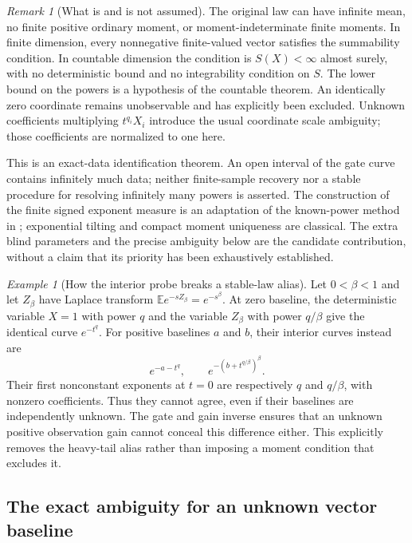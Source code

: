 \documentclass[11pt,letterpaper]{article}
\theoremstyle{definition}
\theoremstyle{remark}
\newtheorem{remark}[theorem]{Remark}
\newtheorem{example}[theorem]{Example}
\newcommand{\1}{\mathbf 1}
\begin{document}
\begin{remark}[What is and is not assumed]
The original law can have infinite mean, no finite positive ordinary
moment, or moment-indeterminate finite moments. In finite dimension,
every nonnegative finite-valued vector satisfies the summability
condition. In countable dimension the condition is $S(X)<\infty$
almost surely, with no deterministic bound and no integrability
condition on $S$. The lower bound on the powers is a hypothesis of
the countable theorem. An identically zero coordinate remains
unobservable and has explicitly been excluded. Unknown coefficients
multiplying $t^{q_i}X_i$ introduce the usual coordinate scale ambiguity;
those coefficients are normalized to one here.

This is an exact-data identification theorem. An open interval of the
gate curve contains infinitely much data; neither finite-sample
recovery nor a stable procedure for resolving infinitely many powers
is asserted. The construction of the finite signed exponent measure
is an adaptation of the known-power method in
\cite[Lemmas~3.2--3.3]{Lenzi2026}; exponential tilting and compact
moment uniqueness are classical. The extra blind parameters and the
precise ambiguity below are the candidate contribution, without a
claim that its priority has been exhaustively established.
\end{remark}

\begin{example}[How the interior probe breaks a stable-law alias]
Let $0<\beta<1$ and let $Z_\beta$ have Laplace transform
$\mathbb E e^{-sZ_\beta}=e^{-s^\beta}$. At zero baseline, the
deterministic variable $X=1$ with power $q$ and the variable
$Z_\beta$ with power $q/\beta$ give the identical curve $e^{-t^q}$.
For positive baselines $a$ and $b$, their interior curves instead are
\[
 e^{-a-t^q},\qquad e^{-(b+t^{q/\beta})^\beta}.
\]
Their first nonconstant exponents at $t=0$ are respectively $q$ and
$q/\beta$, with nonzero coefficients. Thus they cannot agree, even if
their baselines are independently unknown. The gate and gain inverse
ensures that an unknown positive observation gain cannot conceal this
difference either. This explicitly removes the heavy-tail alias rather
than imposing a moment condition that excludes it.
\end{example}

\subsection{The exact ambiguity for an unknown vector baseline}
\end{document}
